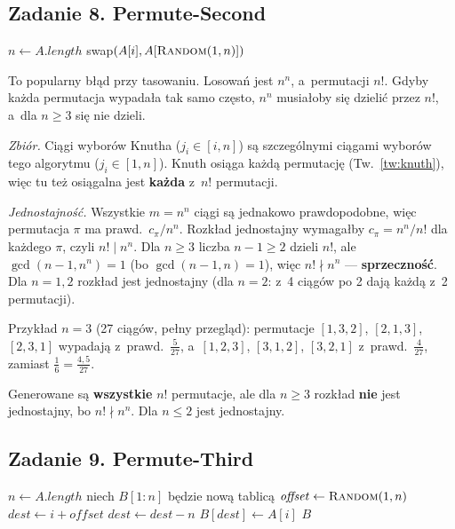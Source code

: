 \documentclass[11pt]{article}
\begin{document}
\subsection{Zadanie 8. Permute-Second}
\begin{tresc}
\begin{algorithmic}[1]
\State $n\gets A.\mathit{length}$
  \State swap$(A[i],A[\textsc{Random}(1,n)])$
\EndFor
\end{algorithmic}
\end{tresc}

\begin{intuicja}
To popularny błąd przy tasowaniu. Losowań jest $n^n$, a~permutacji $n!$.
Gdyby każda permutacja wypadała tak samo często, $n^n$ musiałoby się dzielić
przez $n!$, a~dla $n\ge3$ się nie dzieli.
\end{intuicja}
\formalnie
\emph{Zbiór.} Ciągi wyborów Knutha ($j_i\in[i,n]$) są szczególnymi ciągami
wyborów tego algorytmu ($j_i\in[1,n]$). Knuth osiąga każdą permutację
(Tw.~\ref{tw:knuth}), więc tu też osiągalna jest \textbf{każda} z~$n!$ permutacji.

\emph{Jednostajność.} Wszystkie $m=n^n$ ciągi są jednakowo prawdopodobne,
więc permutacja $\pi$ ma prawd.\ $c_\pi/n^n$. Rozkład jednostajny wymagałby
$c_\pi=n^n/n!$ dla każdego $\pi$, czyli $n!\mid n^n$. Dla $n\ge3$ liczba
$n-1\ge2$ dzieli $n!$, ale $\gcd(n-1,n^n)=1$ (bo $\gcd(n-1,n)=1$), więc
$n!\nmid n^n$ --- \textbf{sprzeczność}. Dla $n=1,2$ rozkład jest jednostajny
(dla $n=2$: z~4 ciągów po 2 dają każdą z~2 permutacji).

Przykład $n=3$ (27 ciągów, pełny przegląd): permutacje $[1,3,2]$, $[2,1,3]$,
$[2,3,1]$ wypadają z~prawd.\ $\frac5{27}$, a~$[1,2,3]$, $[3,1,2]$, $[3,2,1]$
z~prawd.\ $\frac4{27}$, zamiast $\frac{1}{6}=\frac{4{,}5}{27}$.
\begin{odpowiedz}
Generowane są \textbf{wszystkie} $n!$ permutacje, ale dla $n\ge3$ rozkład
\textbf{nie} jest jednostajny, bo $n!\nmid n^n$. Dla $n\le2$ jest jednostajny.
\end{odpowiedz}

\subsection{Zadanie 9. Permute-Third}
\begin{tresc}
\begin{algorithmic}[1]
\State $n\gets A.\mathit{length}$
\State niech $B[1:n]$ będzie nową tablicą
\State $\mathit{offset}\gets\textsc{Random}(1,n)$
  \State $\mathit{dest}\gets i+\mathit{offset}$
   $\mathit{dest}\gets\mathit{dest}-n$ \EndIf
  \State $B[\mathit{dest}]\gets A[i]$
\EndFor
\State \Return $B$
\end{algorithmic}
\end{tresc}
\end{document}
